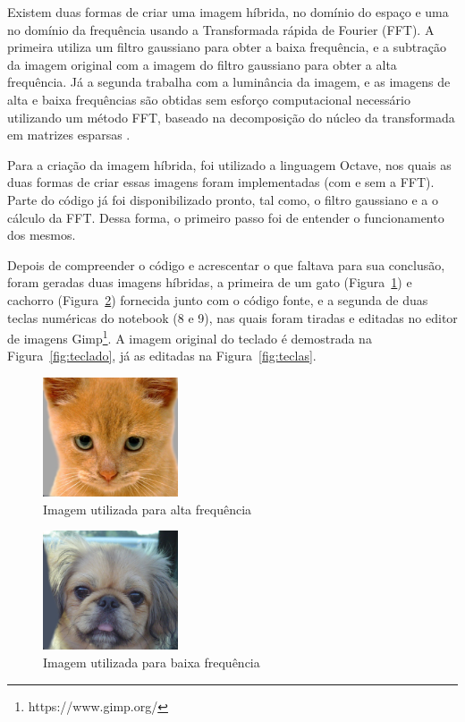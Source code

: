 Existem duas formas de criar uma imagem híbrida, no domínio do espaço e uma no domínio da frequência usando a Transformada rápida de Fourier (FFT). A primeira utiliza um filtro gaussiano para obter a baixa frequência, e a subtração da imagem original com a imagem do filtro gaussiano para obter a alta frequência. Já a segunda trabalha com a luminância da imagem, e as imagens de alta e baixa frequências são obtidas sem esforço computacional necessário utilizando um método FFT, baseado na decomposição  do  núcleo  da  transformada  em  matrizes  esparsas \cite{William}.

Para a criação da imagem híbrida, foi utilizado a linguagem Octave, nos quais as duas formas de criar essas imagens foram implementadas (com e sem a FFT). Parte do código já foi disponibilizado pronto, tal como, o filtro gaussiano e a o cálculo da FFT. Dessa forma, o primeiro passo foi de entender o funcionamento dos mesmos.

Depois de compreender o código e acrescentar o que faltava para sua conclusão, foram geradas duas imagens híbridas, a primeira de um gato (Figura~\ref{fig:cat}) e cachorro (Figura~\ref{fig:dog}) fornecida junto com o código fonte, e a segunda de duas teclas numéricas do notebook (8 e 9), nas quais foram tiradas e editadas no editor de imagens Gimp\footnote{https://www.gimp.org/}. A imagem original do teclado é demostrada na Figura~\ref{fig:teclado}, já as editadas na Figura~\ref{fig:teclas}.

\begin{figure}[h]
    \centering
    \includegraphics[width=4cm]{cat.jpg}
    \caption{Imagem utilizada para alta frequência}
    \label{fig:cat}
\end{figure}

\begin{figure}[h]
    \centering
    \includegraphics[width=4cm]{dog.jpg}
    \caption{Imagem utilizada para baixa frequência}
    \label{fig:dog}
\end{figure}

